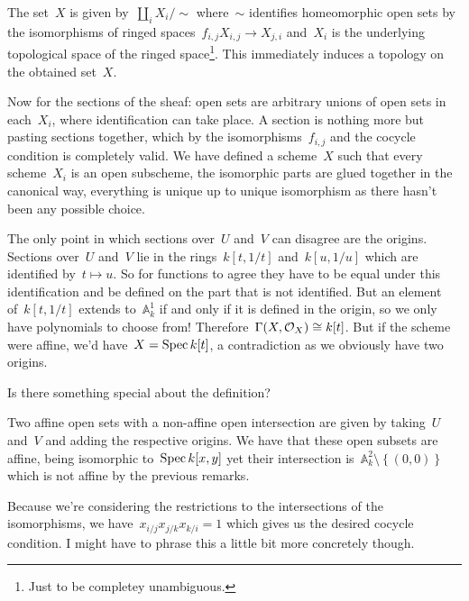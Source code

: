 \begin{exercise}
  The set~$X$ is given by~$\coprod_iX_i/{\sim}$ where~$\sim$ identifies homeomorphic open sets by the isomorphisms of ringed spaces~$f_{i,j}X_{i,j}\to X_{j,i}$ and~$X_i$ is the underlying topological space of the ringed space\footnote{Just to be completey unambiguous.}. This immediately induces a topology on the obtained set~$X$.

  Now for the sections of the sheaf: open sets are arbitrary unions of open sets in each~$X_i$, where identification can take place. A section is nothing more but pasting sections together, which by the isomorphisms~$f_{i,j}$ and the cocycle condition is completely valid. We have defined a scheme~$X$ such that every scheme~$X_i$ is an open subscheme, the isomorphic parts are glued together in the canonical way, everything is unique up to unique isomorphism as there hasn't been any possible choice.
\end{exercise}

\begin{exercise}
  The only point in which sections over~$U$ and~$V$ can disagree are the origins. Sections over~$U$ and~$V$ lie in the rings~$k[t,1/t]$ and~$k[u,1/u]$ which are identified by~$t\mapsto u$. So for functions to agree they have to be equal under this identification and be defined on the part that is not identified. But an element of~$k[t,1/t]$ extends to~$\mathbb{A}_k^1$ if and only if it is defined in the origin, so we only have polynomials to choose from! Therefore~$\Gamma(X,\mathcal{O}_X)\cong k[t]$. But if the scheme were affine, we'd have~$X=\operatorname{Spec} k[t]$, a contradiction as we obviously have two origins.
\end{exercise}

\begin{exercise}
  \label{exercise:54c}
  Is there something special about the definition?

  Two affine open sets with a non-affine open intersection are given by taking~$U$ and~$V$ and adding the respective origins. We have that these open subsets are affine, being isomorphic to~$\operatorname{Spec} k[x,y]$ yet their intersection is~$\mathbb{A}_k^2\setminus\left\{ (0,0) \right\}$ which is not affine by the previous remarks.
\end{exercise}

\begin{exercise}
  Because we're considering the restrictions to the intersections of the isomorphisms, we have~$x_{i/j}x_{j/k}x_{k/i}=1$ which gives us the desired cocycle condition. I might have to phrase this a little bit more concretely though.
\end{exercise}

